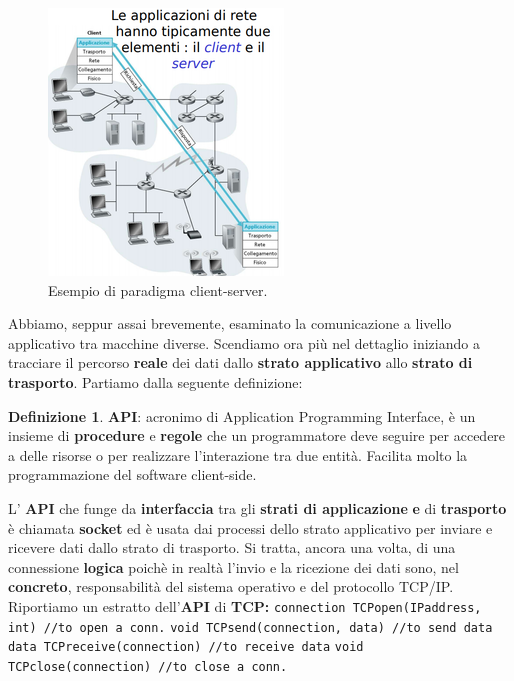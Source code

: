 \documentclass[11pt,a4paper,oneside]{book}
\theoremstyle{definition}
\newtheorem{definition}{Definizione}[section]
\begin{document}
\begin{figure}[!h]
	\includegraphics[scale=0.55]{Immagini/Client_server.png}
	\centering
	\caption{Esempio di paradigma client-server.}
\end{figure}

\pagebreak

Abbiamo, seppur assai brevemente, esaminato la comunicazione a livello applicativo tra macchine diverse. Scendiamo ora più nel dettaglio iniziando a tracciare il percorso \textbf{reale} dei dati dallo \textbf{strato applicativo} allo \textbf{strato di trasporto}. Partiamo dalla seguente definizione:

\theoremstyle{definition}
\begin{definition}
	\textbf{API}: acronimo di Application Programming Interface, è un insieme di \textbf{procedure} e \textbf{regole} che un programmatore deve seguire per accedere a delle risorse o per realizzare l'interazione tra due entità. Facilita molto la programmazione del software client-side.
\end{definition}
L' \textbf{API} che funge da \textbf{interfaccia} tra gli \textbf{strati di applicazione} \textbf{e} di \textbf{trasporto} è chiamata \textbf{socket} ed è usata dai processi dello strato applicativo per inviare e ricevere dati dallo strato di trasporto. Si tratta, ancora una volta, di una connessione \textbf{logica} poichè in realtà l'invio e la ricezione dei dati sono, nel \textbf{concreto}, responsabilità del sistema operativo e del protocollo TCP/IP.\newline
Riportiamo un estratto dell'\textbf{API} di \textbf{TCP:}\newline\newline
\texttt{connection TCPopen(IPaddress, int) //to open a conn.}\newline
\texttt{void TCPsend(connection, data) //to send data}\newline
\texttt{data TCPreceive(connection) //to receive data}\newline
\texttt{void TCPclose(connection) //to close a conn.}
\end{document}
